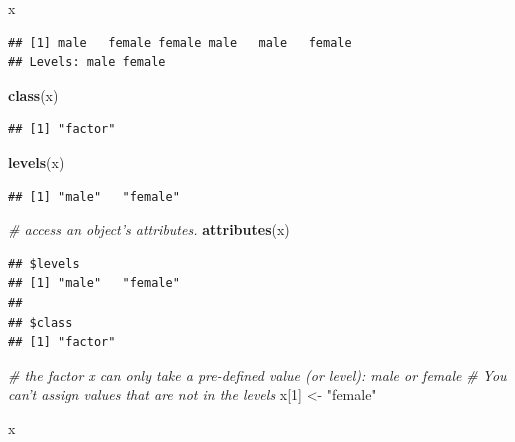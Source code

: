 \documentclass[]{book}
\newenvironment{Shaded}{\begin{snugshade}}{\end{snugshade}}
\newcommand{\KeywordTok}[1]{\textcolor[rgb]{0.13,0.29,0.53}{\textbf{{#1}}}}
\newcommand{\DecValTok}[1]{\textcolor[rgb]{0.00,0.00,0.81}{{#1}}}
\newcommand{\StringTok}[1]{\textcolor[rgb]{0.31,0.60,0.02}{{#1}}}
\newcommand{\CommentTok}[1]{\textcolor[rgb]{0.56,0.35,0.01}{\textit{{#1}}}}
\newcommand{\NormalTok}[1]{{#1}}
\begin{document}
\begin{Shaded}
\begin{Highlighting}[]
\NormalTok{x}
\end{Highlighting}
\end{Shaded}

\begin{verbatim}
## [1] male   female female male   male   female
## Levels: male female
\end{verbatim}

\begin{Shaded}
\begin{Highlighting}[]
\KeywordTok{class}\NormalTok{(x)}
\end{Highlighting}
\end{Shaded}

\begin{verbatim}
## [1] "factor"
\end{verbatim}

\begin{Shaded}
\begin{Highlighting}[]
\KeywordTok{levels}\NormalTok{(x)}
\end{Highlighting}
\end{Shaded}

\begin{verbatim}
## [1] "male"   "female"
\end{verbatim}

\begin{Shaded}
\begin{Highlighting}[]
\CommentTok{# access an object's attributes.}
\KeywordTok{attributes}\NormalTok{(x)}
\end{Highlighting}
\end{Shaded}

\begin{verbatim}
## $levels
## [1] "male"   "female"
## 
## $class
## [1] "factor"
\end{verbatim}

\begin{Shaded}
\begin{Highlighting}[]
\CommentTok{# the factor x can only take a pre-defined value (or level): male or female}
\CommentTok{# You can't assign values that are not in the levels}
\NormalTok{x[}\DecValTok{1}\NormalTok{] <-}\StringTok{ "female"}
\end{Highlighting}
\end{Shaded}

\begin{Shaded}
\begin{Highlighting}[]
\NormalTok{x}
\end{Highlighting}
\end{Shaded}
\end{document}
